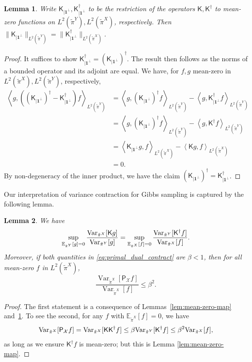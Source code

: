 \documentclass[11pt]{article}
\newtheorem{lemma}{Lemma}
\newcommand{\norms}[1]{\lVert#1\rVert}
\newcommand{\inprod}[2]{\left\langle#1, #2\right\rangle}
\newcommand{\E}{\mathbb{E}}
\newcommand{\Var}{\textup{Var}}
\newcommand{\Par}[1]{\left(#1\right)}
\newcommand{\0}{\mathbf{0}}
\newcommand{\1}{\mathbf{1}}
\newcommand{\calX}{\mathcal{X}}
\newcommand{\sfK}{\mathsf{K}}
\newcommand{\sfP}{\mathsf{P}}
\newcommand{\tpi}{\tilde{\pi}}
\begin{document}
\begin{lemma}\label{lem:norm-subspaces}
    Write $\sfK_{\mid \mathbf{1}^\perp}, \sfK^\dagger_{\mid \mathbf{1}^\perp}$ to be the restriction of the operators $\sfK, \sfK^\dagger$ to mean-zero functions on $L^2(\tpi^Y), L^2(\tpi^X)$, respectively.  Then $\norms{\sfK_{\mid \mathbf{1}^\perp}}_{L^2(\tpi^Y)}=\norms{\sfK^\dagger_{\mid \mathbf{1}^\perp}}_{L^2(\tpi^X)}$.
\end{lemma}
\begin{proof}
    It suffices to show $\sfK^\dagger_{\mid \mathbf{1}^\perp}=(\sfK_{\mid \mathbf{1}^\perp})^\dagger$. The result then follows as the norms of a bounded operator and its adjoint are equal.  We have, for $f, g$ mean-zero in $L^2(\tpi^X), L^2(\tpi^Y)$, respectively,
    \begin{align*}
        \inprod{g}{\Par{\Par{\sfK_{\mid \mathbf{1}^\perp}}^\dagger -\sfK^\dagger_{\mid \mathbf{1}^\perp} } f}_{L^2(\tpi^Y)}
        &=\inprod{g}{\Par{\sfK_{\mid \mathbf{1}^\perp}}^\dagger f}_{L^2(\tpi^Y)} -\inprod{g}{\sfK^\dagger_{\mid \mathbf{1}^\perp} f}_{L^2(\tpi^Y)}\\
        &=\inprod{g}{\Par{\sfK_{\mid \mathbf{1}^\perp}}^\dagger f}_{L^2(\tpi^Y)} -\inprod{g}{\sfK^\dagger f}_{L^2(\tpi^Y)}\\
        &=\inprod{\sfK_{\mid \mathbf{1}^\perp} g}{f}_{L^2(\tpi^X)}-\inprod{\sfK g}{f}_{L^2(\tpi^X)}\\
        &=0.
    \end{align*}
    By non-degeneracy of the inner product, we have the claim $(\sfK_{\mid \mathbf{1}^\perp})^\dagger =\sfK^\dagger_{\mid \mathbf{1}^\perp}$.
\end{proof}

Our interpretation of variance contraction for Gibbs sampling is captured by the following lemma. 

\begin{lemma}\label{lem:equivalence-forward-backward}
    We have \begin{equation}\label{eq:primal_dual_contract}
    \sup_{\mathbb{E}_{\tpi^Y}[g]=0}\frac{\Var_{\tpi^X}[\sfK g]}{\Var_{\tpi^Y}[g]} = \sup_{\mathbb{E}_{\tpi^X}[f]=0}\frac{\Var_{\tpi^Y}[\sfK^\dagger f]}{\Var_{\tpi^X}[f]}.
    \end{equation}
Moreover, if both quantities in \eqref{eq:primal_dual_contract} are $\beta < 1$, then for all mean-zero $f$ in $L^2(\tpi^X)$,
\[\frac{\operatorname{Var}_{\tpi^X}[\sfP_\calX f]}{\operatorname{Var}_{\tpi^X}[f]} \leq \beta^2 .\]
\end{lemma}
\begin{proof}
The first statement is a consequence of Lemmas~\ref{lem:mean-zero-map} and~\ref{lem:norm-subspaces}. To see the second, for any $f$ with $\E_{\tpi^X}[f]=0$, we have \begin{align*}
        \Var_{\tpi^X}[\sfP_\calX f] =\Var_{\tpi^X}[\sfK \sfK^\dagger f] \le \beta \Var_{\tpi^Y}[ \sfK^\dagger f] \le \beta^2\Var_{\tpi^X}[f],
    \end{align*}
    as long as we ensure $\sfK^\dagger f$ is mean-zero; but this is Lemma \ref{lem:mean-zero-map}.
\end{proof}
\end{document}
